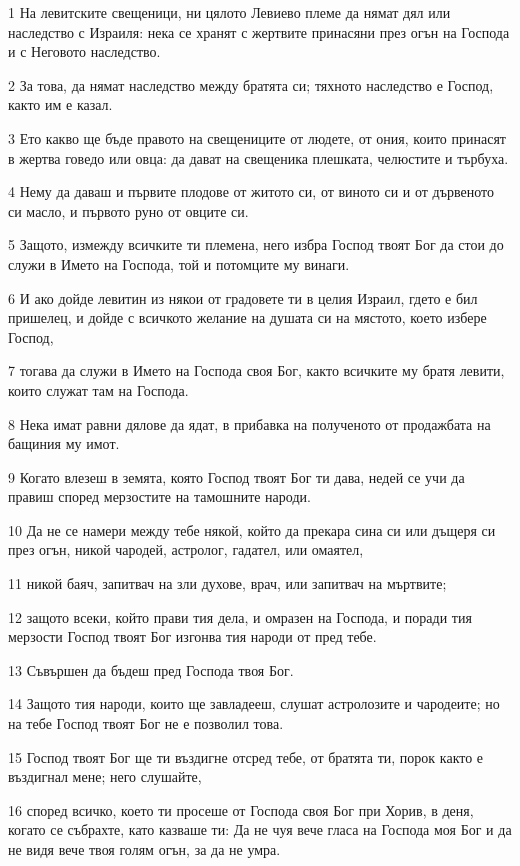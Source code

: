 \par 1 На левитските свещеници, ни цялото Левиево племе да нямат дял или наследство с Израиля: нека се хранят с жертвите принасяни през огън на Господа и с Неговото наследство.
\par 2 За това, да нямат наследство между братята си; тяхното наследство е Господ, както им е казал.
\par 3 Ето какво ще бъде правото на свещениците от людете, от ония, които принасят в жертва говедо или овца: да дават на свещеника плешката, челюстите и търбуха.
\par 4 Нему да даваш и първите плодове от житото си, от виното си и от дървеното си масло, и първото руно от овците си.
\par 5 Защото, измежду всичките ти племена, него избра Господ твоят Бог да стои до служи в Името на Господа, той и потомците му винаги.
\par 6 И ако дойде левитин из някои от градовете ти в целия Израил, гдето е бил пришелец, и дойде с всичкото желание на душата си на мястото, което избере Господ,
\par 7 тогава да служи в Името на Господа своя Бог, както всичките му братя левити, които служат там на Господа.
\par 8 Нека имат равни дялове да ядат, в прибавка на полученото от продажбата на бащиния му имот.
\par 9 Когато влезеш в земята, която Господ твоят Бог ти дава, недей се учи да правиш според мерзостите на тамошните народи.
\par 10 Да не се намери между тебе някой, който да прекара сина си или дъщеря си през огън, никой чародей, астролог, гадател, или омаятел,
\par 11 никой баяч, запитвач на зли духове, врач, или запитвач на мъртвите;
\par 12 защото всеки, който прави тия дела, и омразен на Господа, и поради тия мерзости Господ твоят Бог изгонва тия народи от пред тебе.
\par 13 Съвършен да бъдеш пред Господа твоя Бог.
\par 14 Защото тия народи, които ще завладееш, слушат астролозите и чародеите; но на тебе Господ твоят Бог не е позволил това.
\par 15 Господ твоят Бог ще ти въздигне отсред тебе, от братята ти, порок както е въздигнал мене; него слушайте,
\par 16 според всичко, което ти просеше от Господа своя Бог при Хорив, в деня, когато се събрахте, като казваше ти: Да не чуя вече гласа на Господа моя Бог и да не видя вече твоя голям огън, за да не умра.
